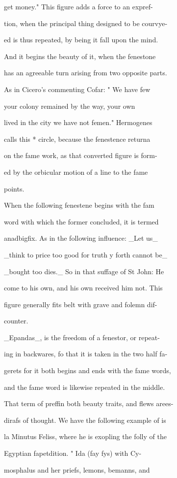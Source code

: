 \documentclass{article}
\begin{document}
get money." This figure adds a force to an expref-

tion, when the principal thing designed to be courvye-

ed is thus repeated, by being it fall upon the mind.

And it begins the beauty of it, when the fenestone

has an agreeable turn arising from two opposite parts.

As in Cicero's commenting Cofar: " We have few

your colony remained by the way, your own

lived in the city we have not femen." Hermogenes

calls this * circle, because the fenestence returna

on the fame work, as that converted figure is form-

ed by the orbicular motion of a line to the fame

points.

When the following fenestene begins with the fam

word with which the former concluded, it is termed

anadbigfix. As in the following influence: \_Let us\_

\_think to price too good for truth y forth cannot be\_

\_bought too dies.\_ So in that suffage of St John: He

come to his own, and his own received him not. This

figure generally fits belt with grave and folemn dif-

counter.

\_Epandas\_, is the freedom of a fenestor, or repeat-

ing in backwares, fo that it is taken in the two half fa-

gerets for it both begins and ends with the fame words,

and the fame word is likewise repeated in the middle.

That term of preffin both beauty traits, and flews arees-

dirafs of thought. We have the following example of is

la Minutus Feliss, where he is exopling the folly of the

Egyptian fapetdition. " Ida (fay fys) with Cy-

mosphalus and her priefs, lemons, bemanns, and
\end{document}
